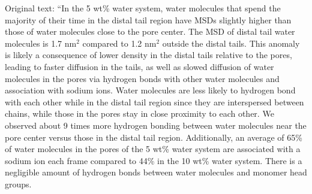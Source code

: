 \documentclass{article}
\begin{document}
\begin{enumerate}
    Original text: ``In the 5 wt\% water system, water molecules that spend the majority
    of their time in the distal tail region have MSDs slightly higher than those of water
    molecules close to the pore center. The MSD of distal tail water molecules is 1.7 nm$^2$
    compared to 1.2 nm$^2$ outside the distal tails. This anomaly is likely a consequence
    of lower density in the distal tails relative to the pores, leading to faster diffusion
    in the tails, as well as slowed diffusion of water molecules in the pores via hydrogen 
    bonds with other water molecules and association with sodium ions. Water molecules are 
    less likely to hydrogen bond with each other while in the distal tail region since they
    are interspersed between chains, while those in the pores stay in close proximity to 
    each other. We observed about 9 times more hydrogen bonding between water molecules 
    near the pore center versus those in the distal tail region. Additionally, an average 
    of 65\% of water molecules in the pores of the 5 wt\% water system are associated
    with a sodium ion each frame compared to 44\% in the 10 wt\% water system. There is a
    negligible amount of hydrogen bonds between water molecules and monomer head groups.
    

\end{enumerate}
\end{document}

